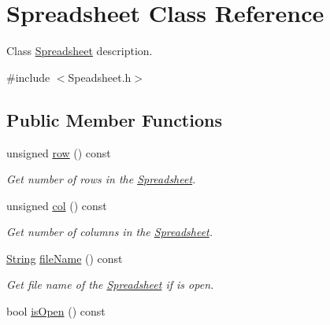 \hypertarget{class_spreadsheet}{}\section{Spreadsheet Class Reference}
\label{class_spreadsheet}


Class \hyperlink{class_spreadsheet}{Spreadsheet} description.  




{\ttfamily \#include $<$Speadsheet.\+h$>$}

\subsection*{Public Member Functions}
\begin{DoxyCompactItemize}
\item 
\mbox{\label{class_spreadsheet_ac2cd7c97b5d73805edcd14891d910f51}} 
unsigned \hyperlink{class_spreadsheet_ac2cd7c97b5d73805edcd14891d910f51}{row} () const
\begin{DoxyCompactList}\small\item\em Get number of rows in the \hyperlink{class_spreadsheet}{Spreadsheet}. \end{DoxyCompactList}\item 
\mbox{\label{class_spreadsheet_abee8b54fceb0f2c4314bbaf624feed75}} 
unsigned \hyperlink{class_spreadsheet_abee8b54fceb0f2c4314bbaf624feed75}{col} () const
\begin{DoxyCompactList}\small\item\em Get number of columns in the \hyperlink{class_spreadsheet}{Spreadsheet}. \end{DoxyCompactList}\item 
\mbox{\label{class_spreadsheet_a29e1c16f68d43f5ce96c15f1c18c71de}} 
\hyperlink{class_string}{String} \hyperlink{class_spreadsheet_a29e1c16f68d43f5ce96c15f1c18c71de}{file\+Name} () const
\begin{DoxyCompactList}\small\item\em Get file name of the \hyperlink{class_spreadsheet}{Spreadsheet} if is open. \end{DoxyCompactList}\item 
\mbox{\label{class_spreadsheet_a4c8bab95a22c86d5a8a75e54a7e82c51}} 
bool \hyperlink{class_spreadsheet_a4c8bab95a22c86d5a8a75e54a7e82c51}{is\+Open} () const

\end{DoxyCompactItemize}
